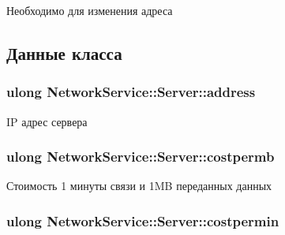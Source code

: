 Необходимо для изменения адреса 



\subsection{Данные класса}
\hypertarget{class_network_service_1_1_server_a09382556ff4ab5abc7a79a333ad92329}{}
\subsubsection[{address}]{\setlength{\rightskip}{0pt plus 5cm}ulong Network\+Service\+::\+Server\+::address\hspace{0.3cm}{\ttfamily [private]}}\label{class_network_service_1_1_server_a09382556ff4ab5abc7a79a333ad92329}


I\+P адрес сервера 

\hypertarget{class_network_service_1_1_server_a44f0b3aacbbbbbcf0216974c23d1baf1}{}
\subsubsection[{costpermb}]{\setlength{\rightskip}{0pt plus 5cm}ulong Network\+Service\+::\+Server\+::costpermb\hspace{0.3cm}{\ttfamily [private]}}\label{class_network_service_1_1_server_a44f0b3aacbbbbbcf0216974c23d1baf1}


Стоимость 1 минуты связи и 1\+M\+B переданных данных 

\hypertarget{class_network_service_1_1_server_a8b24807f5ca15d5348734cf5f4fe96ff}{}
\subsubsection[{costpermin}]{\setlength{\rightskip}{0pt plus 5cm}ulong Network\+Service\+::\+Server\+::costpermin\hspace{0.3cm}{\ttfamily [private]}}\label{class_network_service_1_1_server_a8b24807f5ca15d5348734cf5f4fe96ff}
\hypertarget{class_network_service_1_1_server_aaab7735b4b5809169ecb92fa66f0bca7}{}
